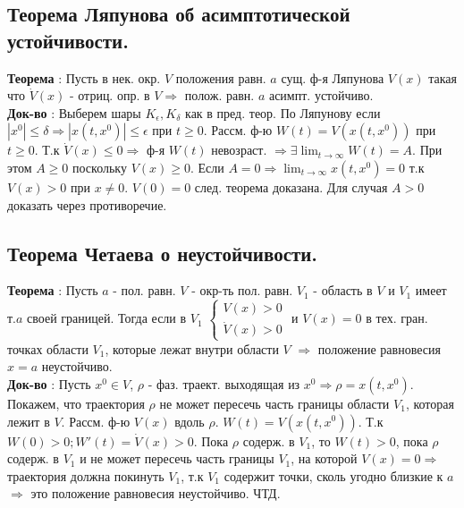 \documentclass[unicode, 8pt, a4paper,oneside, landscape]{article}
\begin{document}
\begin{multicols}{4}

\subsection{Теорема Ляпунова об асимптотической устойчивости.}

{\bf Теорема} : Пусть в нек. окр. $V$ положения равн. $a$ сущ. ф-я Ляпунова $V(x)$ такая что $\dot{V}(x)$ - отриц. опр. в $V \Rightarrow$ полож. равн. $a$ асимпт. устойчиво.\\
{\bf Док-во} : Выберем шары $K_\epsilon, K_\delta$ как в пред. теор. По Ляпунову если $|x^0| \leq \delta \Rightarrow |x(t, x^0)| \leq \epsilon$ при $t \geq 0$. Рассм. ф-ю $W(t) = V(x(t, x^0))$ при $t \geq 0$. Т.к $\dot{V}(x) \leq 0 \Rightarrow$ ф-я $W(t)$ невозраст. $\Rightarrow \exists \lim_{t \to \infty} W(t) = A$. При этом $A \geq 0$ поскольку $V(x) \geq 0$. Если $A = 0 \Rightarrow \lim_{t \to \infty} x(t, x^0) = 0$ т.к $V(x) > 0$ при $x \neq 0$. $V(0) = 0$ след. теорема доказана. Для случая $A > 0$ доказать через противоречие.


\subsection{Теорема Четаева о неустойчивости.}

{\bf Теорема} : Пусть $a$ - пол. равн. $V$ - окр-ть пол. равн. $V_1$ - область в $V$ и $V_1$ имеет т.$a$ своей границей. Тогда если в $V_1$ $\begin{cases} V(x) > 0 \\ \dot{V}(x) > 0 \end{cases}$ и $V(x) = 0$ в тех. гран. точках области $V_1$, которые лежат внутри области $V$ $\Rightarrow$ положение равновесия $x = a$ неустойчиво.\\
{\bf Док-во} : Пусть $x^0 \in V$, $\rho$ - фаз. траект. выходящая из $x^0 \Rightarrow \rho = x(t, x^0)$. Покажем, что траектория $\rho$ не может пересечь часть границы области $V_1$, которая лежит в $V$. Рассм. ф-ю $V(x)$ вдоль $\rho$. $W(t) = V(x(t, x^0))$. Т.к $W(0) > 0; W'(t) = \dot{V}(x) > 0$. Пока $\rho$ содерж. в $V_1$, то $W(t) > 0$, пока $\rho$ содерж. в $V_1$ и не может пересечь часть границы $V_1$, на которой $V(x) = 0 \Rightarrow$ траектория должна покинуть $V_1$, т.к $V_1$ содержит точки, сколь угодно близкие к $a$ $\Rightarrow$ это положение равновесия неустойчиво. ЧТД.


\end{multicols}
\end{document}
